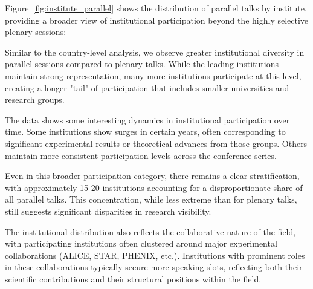 \documentclass[a4paper,11pt]{article}
\begin{document}
Figure~\ref{fig:institute_parallel} shows the distribution of parallel talks by institute, providing a broader view of institutional participation beyond the highly selective plenary sessions:

Similar to the country-level analysis, we observe greater institutional diversity in parallel sessions compared to plenary talks. While the leading institutions maintain strong representation, many more institutions participate at this level, creating a longer "tail" of participation that includes smaller universities and research groups.

The data shows some interesting dynamics in institutional participation over time. Some institutions show surges in certain years, often corresponding to significant experimental results or theoretical advances from those groups. Others maintain more consistent participation levels across the conference series.

Even in this broader participation category, there remains a clear stratification, with approximately 15-20 institutions accounting for a disproportionate share of all parallel talks. This concentration, while less extreme than for plenary talks, still suggests significant disparities in research visibility.

The institutional distribution also reflects the collaborative nature of the field, with participating institutions often clustered around major experimental collaborations (ALICE, STAR, PHENIX, etc.). Institutions with prominent roles in these collaborations typically secure more speaking slots, reflecting both their scientific contributions and their structural positions within the field.
\end{document}
